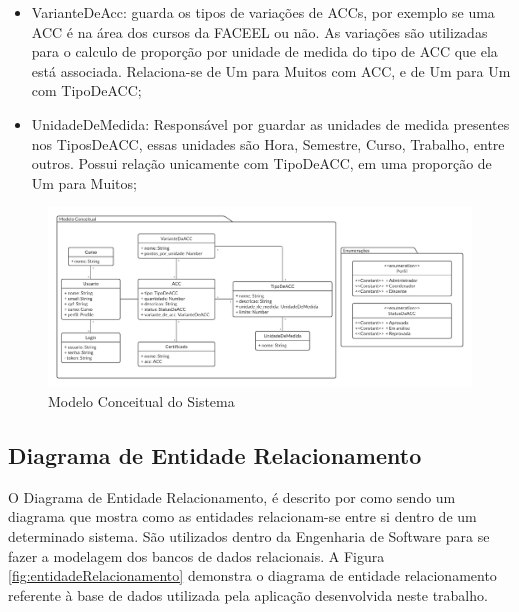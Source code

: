 \begin{itemize}
    \item VarianteDeAcc: guarda os tipos de variações de ACCs, por exemplo se uma ACC é na área dos cursos da FACEEL ou não. As variações são utilizadas para o calculo de proporção por unidade de medida do tipo de ACC que ela está associada. Relaciona-se de Um para Muitos com ACC, e de Um para Um com TipoDeACC;
    \item UnidadeDeMedida: Responsável por guardar as unidades de medida presentes nos TiposDeACC, essas unidades são Hora, Semestre, Curso, Trabalho, entre outros. Possui relação unicamente com TipoDeACC, em uma proporção de Um para Muitos;
\end{itemize}

\begin{figure}[H]
    \centering
    \includegraphics[width=\textwidth]{dados/figuras/Proposta/modelo_conceitual__keeme.pdf}
    \caption{Modelo Conceitual do Sistema}
    \label{fig:modeloConceitual}
\end{figure}

\subsection{Diagrama de Entidade Relacionamento}
\label{sec:diagramaER}

O Diagrama de Entidade Relacionamento, é descrito por \cite{lucid2021er} como sendo um diagrama que mostra como as entidades relacionam-se entre si dentro de um determinado sistema. São utilizados dentro da Engenharia de Software para se fazer a modelagem dos bancos de dados relacionais. A Figura \ref{fig:entidadeRelacionamento} demonstra o diagrama de entidade relacionamento referente à base de dados utilizada pela aplicação desenvolvida neste trabalho.

